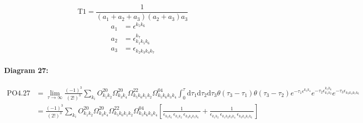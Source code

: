 \documentclass[10pt,a4paper]{article}
\begin{document}
\begin{equation}
\text{T}1 = \frac{1}{(a_1+ a_2+ a_3)(a_2+ a_3)a_3}\end{equation}
\begin{align*}
a_1 &= \epsilon^{k_{5}k_{6}}_{}\\
a_2 &= \epsilon^{k_{7}}_{k_{1}k_{5}k_{6}}\\
a_3 &= \epsilon^{}_{k_{2}k_{3}k_{4}k_{7}}
\end{align*}
\paragraph{Diagram 27:}
\begin{align}
\text{PO}4.27
&= \lim\limits_{\tau \to \infty}\frac{(-1)^3 }{(2!)^3}\sum_{k_i}O^{20}_{k_{1}k_{2}} \Omega^{20}_{k_{3}k_{4}} \Omega^{22}_{k_{5}k_{6}k_{1}k_{2}} \Omega^{04}_{k_{5}k_{6}k_{3}k_{4}} \int_{0}^{\tau}\mathrm{d}\tau_1\mathrm{d}\tau_2\mathrm{d}\tau_3\theta(\tau_3-\tau_1) \theta(\tau_3-\tau_2) e^{-\tau_1 \epsilon^{k_{3}k_{4}}_{}}e^{-\tau_2 \epsilon^{k_{5}k_{6}}_{k_{1}k_{2}}}e^{-\tau_3 \epsilon^{}_{k_{3}k_{4}k_{5}k_{6}}}
 \nonumber \\
&= \frac{(-1)^3 }{(2!)^3}\sum_{k_i}O^{20}_{k_{1}k_{2}} \Omega^{20}_{k_{3}k_{4}} \Omega^{22}_{k_{5}k_{6}k_{1}k_{2}} \Omega^{04}_{k_{5}k_{6}k_{3}k_{4}} \left[\frac{1}{\epsilon^{}_{k_{5}k_{6}}\ \epsilon^{}_{k_{1}k_{2}}\ \epsilon^{}_{k_{3}k_{4}k_{5}k_{6}}\ } + \frac{1}{\epsilon^{}_{k_{1}k_{2}}\ \epsilon^{}_{k_{1}k_{2}k_{3}k_{4}}\ \epsilon^{}_{k_{3}k_{4}k_{5}k_{6}}\ } \right]
\end{align}
\end{document}
